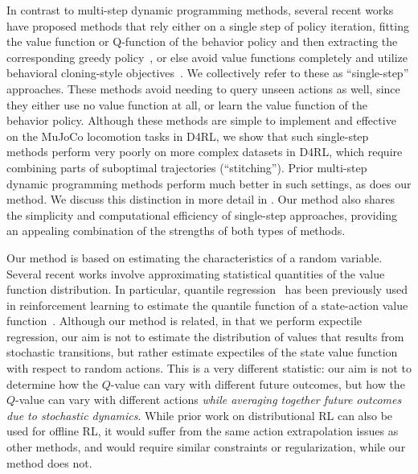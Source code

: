In contrast to multi-step dynamic programming methods, several recent works have proposed methods that rely either on a single step of policy iteration, fitting the value function or Q-function of the behavior policy and then extracting the corresponding greedy policy~\citep{peng2019advantage,brandfonbrener2021offline,gulcehre2021regularized}, or else avoid value functions completely and utilize behavioral cloning-style objectives~\citep{chen2021decision}. We collectively refer to these as ``single-step''
approaches. These methods avoid needing to query unseen actions as well, since they either use no value function at all, or learn the value function of the behavior policy. Although these methods are simple to implement and effective on the MuJoCo locomotion tasks in D4RL, we show that such single-step methods perform very poorly on more complex datasets in D4RL, which require combining parts of suboptimal trajectories (``stitching''). Prior multi-step dynamic programming methods perform much better in such settings, as does our method. We discuss this distinction in more detail in . Our method also shares the simplicity and computational efficiency of single-step approaches, providing an appealing combination of the strengths of both types of methods.

Our method is based on estimating the characteristics of a random variable. Several recent works involve approximating statistical quantities of the value function distribution. In particular, quantile regression~\citep{koenker2001quantile} has been previously used in reinforcement learning to estimate the quantile function of a state-action value function~\citep{dabney2018distributional, dabney2018implicit,kuznetsov2020controlling}.
Although our method is related, in that we perform expectile regression, our aim is not to estimate the distribution of values that results from stochastic transitions, but rather estimate expectiles of the state value function with respect to random actions.
This is a very different statistic: our aim is not to determine how the $Q$-value can vary with different future outcomes, but how the $Q$-value can vary with different actions \emph{while averaging together future outcomes due to stochastic dynamics}. While prior work on distributional RL can also be used for offline RL, it would suffer from the same action extrapolation issues as other methods, and would require similar constraints or regularization, while our method does not.

